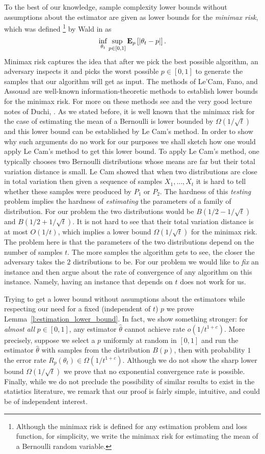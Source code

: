 To the best of our knowledge, sample complexity lower bounds without
assumptions about the estimator are given as lower bounds for the
\emph{minimax risk}, which was defined
\footnote{
Although the minimax risk is defined for any estimation problem and loss
function, for simplicity, we write the minimax risk for estimating the mean
of a Bernoulli random variable.}
  by Wald in \cite{Wal39} as
\[
  \inf_{\theta_t} \sup_{p\in[0,1]} \bm{\mathrm{E}}_{p} \left[ |\theta_t - p| \right].
\]
Minimax risk captures the idea that after we pick the best possible
algorithm, an adversary inspects it and picks the worst possible
$p \in[0,1]$ to generate the samples that our algorithm will get as input.
The methods of Le'Cam, Fano, and Assouad are well-known
information-theoretic methods to establish lower bounds for the minimax risk.
For more on these methods see \cite{Yu97, Tsy08} and the
very good lecture notes of Duchi, \cite{duchi_stats311}.
As we stated before, it is well known that the minimax risk for the
case of estimating the mean of a Bernoulli is lower bounded by
$\Omega(1/\sqrt{t})$ and this lower bound can be established
by Le Cam's method.
In order to show why such arguments do no work for our purposes
we shall sketch how one would apply Le Cam's method to get this lower bound.
To apply Le Cam's method, one typically chooses two Bernoulli distributions
whose means are far but their total variation distance is small.
Le Cam showed that when two distributions are close in total variation then
given a sequence of samples $X_1, \ldots, X_t$ it is hard to tell whether
these samples were produced by $P_1$ or $P_2$. The hardness of this \emph{testing}
problem implies the hardness of \emph{estimating} the parameters of
a family of distribution.
For our problem the two distributions would be $B(1/2 - 1/\sqrt{t})$
and $B(1/2 + 1/\sqrt{t})$. It is not hard to see that their total variation
distance is at most $O(1/t)$, which implies a lower bound
$\Omega(1/\sqrt{t})$ for the minimax risk. The problem here is that
the parameters of the two distributions depend on the number of
samples $t$. The more samples the algorithm gets to see, the closer
the adversary takes the $2$ distributions to be.
For our problem we would like to \emph{fix} an instance and then argue
about the rate of convergence of any algorithm on this instance.
Namely, having an instance that depends on $t$ does not work for us.

Trying to get a lower bound without assumptions about the estimators
while respecting our need for a fixed (independent of $t$) $p$ we prove
Lemma~\ref{l:estimation_lower_bound}.
In fact, we show something stronger:
for \emph{almost all} $p \in [0,1]$, any estimator $\hat{\theta}$ cannot
achieve rate $o(1/t^{1+c})$.
More precisely,  suppose we select a $p$ uniformly at
random in $[0,1]$ and run the estimator $\hat{\theta}$ with samples from the
distribution $B(p)$, then with probability $1$ the error rate $R_p(\theta_t) \in
\Omega(1/t^{1+c})$. Although we do not show the sharp lower bound
$\Omega(1/\sqrt{t})$ we prove that no exponential convergence rate
is possible.
Finally, while we do not preclude the possibility of similar results to exist
in the statistics literature, we remark that our proof is fairly simple,
intuitive, and could be of independent interest.

